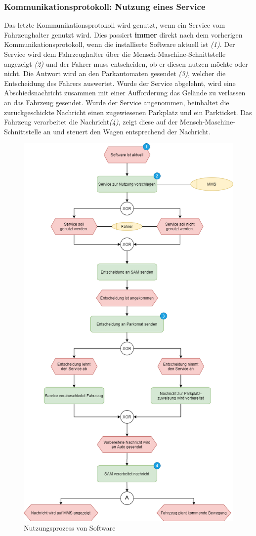 \subsubsection{Kommunikationsprotokoll: Nutzung eines Service}
Das letzte Kommunikationsprotokoll wird genutzt, wenn ein Service vom Fahrzeughalter genutzt wird. Dies passiert \textbf{immer} direkt nach dem vorherigen Kommunikationsprotokoll, wenn die installierte Software aktuell ist \textit{(1)}. Der Service wird dem Fahrzeughalter über die Mensch-Maschine-Schnittstelle angezeigt \textit{(2)} und der Fahrer muss entscheiden, ob er diesen nutzen möchte oder nicht. Die Antwort wird an den Parkautomaten gesendet \textit{(3)}, welcher die Entscheidung des Fahrers auswertet. Wurde der Service abgelehnt, wird eine Abschiedsnachricht zusammen mit einer Aufforderung das Gelände zu verlassen an das Fahrzeug gesendet. Wurde der Service angenommen, beinhaltet die zurückgeschickte Nachricht einen zugewiesenen Parkplatz und ein Parkticket. Das Fahrzeug verarbeitet die Nachricht\textit{(4)}, zeigt diese auf der Mensch-Maschine-Schnittstelle an und steuert den Wagen entsprechend der Nachricht.
\begin{figure}[!h]
	\centering
	\includegraphics[width=0.75\columnwidth]{pictures/konzept-Nutzungsprozess.png}
	\caption{Nutzungsprozess von Software}
\end{figure}
\clearpage
